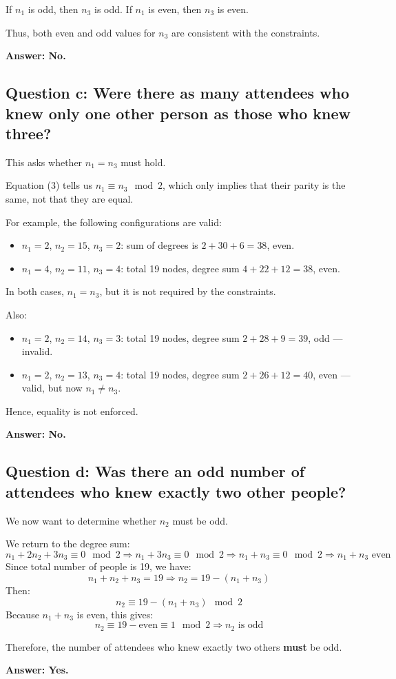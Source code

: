 \documentclass[12pt]{article}
\begin{document}
If \( n_1 \) is odd, then \( n_3 \) is odd.
If \( n_1 \) is even, then \( n_3 \) is even.

Thus, both even and odd values for \( n_3 \) are consistent with the constraints.

\textbf{Answer: No.}

\subsection{Question c: Were there as many attendees who knew only one other person as those who knew three?}

This asks whether \( n_1 = n_3 \) must hold.

Equation (3) tells us \( n_1 \equiv n_3 \mod 2 \), which only implies that their parity is the same, not that they are equal.

For example, the following configurations are valid:
\begin{itemize}
    \item \( n_1 = 2 \), \( n_2 = 15 \), \( n_3 = 2 \): sum of degrees is \( 2 + 30 + 6 = 38 \), even.
    \item \( n_1 = 4 \), \( n_2 = 11 \), \( n_3 = 4 \): total 19 nodes, degree sum \( 4 + 22 + 12 = 38 \), even.
\end{itemize}

In both cases, \( n_1 = n_3 \), but it is not required by the constraints.

Also:
\begin{itemize}
    \item \( n_1 = 2 \), \( n_2 = 14 \), \( n_3 = 3 \): total 19 nodes, degree sum \( 2 + 28 + 9 = 39 \), odd — invalid.
    \item \( n_1 = 2 \), \( n_2 = 13 \), \( n_3 = 4 \): total 19 nodes, degree sum \( 2 + 26 + 12 = 40 \), even — valid, but now \( n_1 \ne n_3 \).
\end{itemize}

Hence, equality is not enforced.

\textbf{Answer: No.}

\subsection{Question d: Was there an odd number of attendees who knew exactly two other people?}

We now want to determine whether \( n_2 \) must be odd.

We return to the degree sum:
\[
n_1 + 2n_2 + 3n_3 \equiv 0 \mod 2
\Rightarrow n_1 + 3n_3 \equiv 0 \mod 2
\Rightarrow n_1 + n_3 \equiv 0 \mod 2
\Rightarrow n_1 + n_3 \text{ even}
\]
Since total number of people is 19, we have:
\[
n_1 + n_2 + n_3 = 19 \Rightarrow n_2 = 19 - (n_1 + n_3)
\]
Then:
\[
n_2 \equiv 19 - (n_1 + n_3) \mod 2
\]
Because \( n_1 + n_3 \) is even, this gives:
\[
n_2 \equiv 19 - \text{even} \equiv 1 \mod 2
\Rightarrow n_2 \text{ is odd}
\]

Therefore, the number of attendees who knew exactly two others \textbf{must} be odd.

\textbf{Answer: Yes.}
\end{document}
